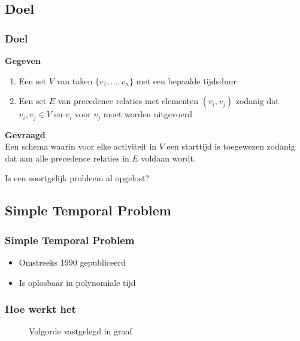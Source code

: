 \documentclass{beamer}
\theoremstyle{definition}
\newcommand{\inputtikz}[1]{}
\begin{document}
\subsection{Doel}
\begin{frame}
    	\frametitle{Doel}
   	\textbf{Gegeven}
	\begin{enumerate}
		\item Een set $V$ van taken $\{v_1,\dots,v_n\}$ met een bepaalde tijdsduur
		\item Een set $E$ van precedence relaties met elementen $(v_i, v_j)$ zodanig dat $v_i, v_j \in V$ en $v_i$ voor $v_j$ moet worden uitgevoerd
	\end{enumerate}
	
	\textbf{Gevraagd}\\
	Een schema waarin voor elke activiteit in $V$ een starttijd is toegewezen zodanig dat aan alle precedence relaties in $E$ voldaan wordt.
\end{frame}

\begin{frame}
	\begin{center}
		Is een soortgelijk probleem al opgelost?
	\end{center}
\end{frame}

\subsection{Simple Temporal Problem}
\begin{frame}
    	\frametitle{Simple Temporal Problem}
	
	\begin{itemize}
		\item Omstreeks 1990 gepubliceerd
		\item Is oplosbaar in polynomiale tijd
	\end{itemize}
   	
\end{frame}

\begin{frame}
    	\frametitle{Hoe werkt het}
	
	\begin{figure}[ht]
		\inputtikz{stn_precedence}
		\vspace{-1em}
		\caption{Volgorde vastgelegd in graaf}
	\end{figure}
\end{frame}
\end{document}
